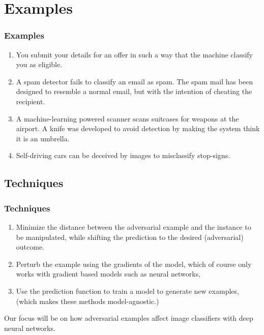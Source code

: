 \documentclass[14pt]{beamer}
\begin{document}
\section{Examples}
\begin{frame}
\frametitle{Examples}
\begin{enumerate}
	\item You submit your details for an offer in such a way that the machine classify you as eligible.
	\item A spam detector fails to classify an email as spam. The spam mail has been designed to resemble a normal email, but with the intention of cheating the recipient.
	\item A machine-learning powered scanner scans suitcases for weapons at the airport. A knife was developed to avoid detection by making the system think it is an umbrella.
	\item Self-driving cars can be deceived by images to misclassify stop-signs.
\end{enumerate}
\end{frame}

\subsection{Techniques}
\begin{frame}
\frametitle{Techniques}
\begin{enumerate}
	\item Minimize the distance between the adversarial example and the instance to be manipulated, while shifting the prediction to the desired (adversarial) outcome. 
	\item Perturb the example using the gradients of the model, which of course only works with gradient based models such as neural networks,
	\item Use the prediction function to train a model to generate new examples, (which makes these methods model-agnostic.)
\end{enumerate}
Our focus will be on how adversarial examples affect image classifiers with deep neural networks.
\end{frame}
\end{document}
